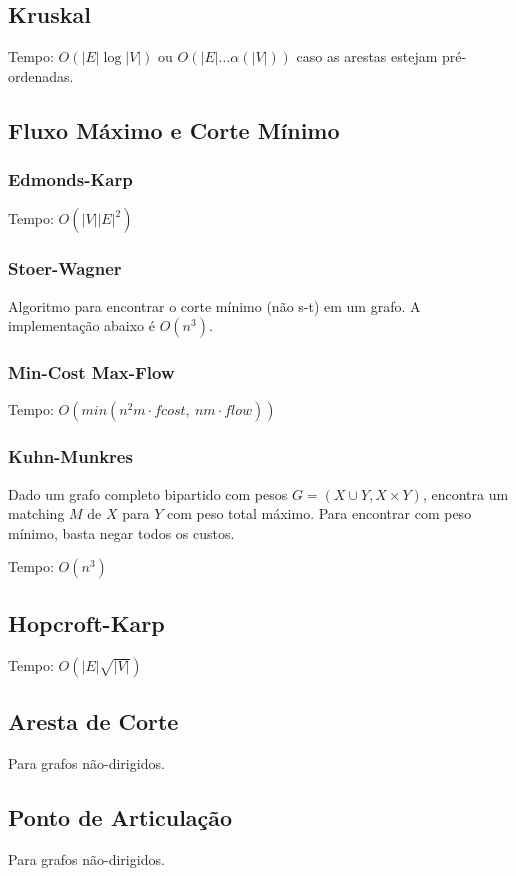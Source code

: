 \documentclass[12pt,a4paper]{article}
\begin{document}
		\subsection{Kruskal}
			Tempo: \( O(|E| \log |V|) \) ou \( O(|E| \ldots \alpha(|V|)) \) caso as arestas estejam pré-ordenadas.
			
		\subsection{Fluxo Máximo e Corte Mínimo}
			\subsubsection{Edmonds-Karp}
				Tempo: \( O(|V| |E|^2) \)
				
			\subsubsection{Stoer-Wagner}
				Algoritmo para encontrar o corte mínimo (não s-t) em um grafo. A implementação abaixo é \(O(n^3)\).
				
			\subsubsection{Min-Cost Max-Flow}
				Tempo: \( O(min(n^2 m \cdot fcost, ~ n m \cdot flow) ) \)
				
			\subsubsection{Kuhn-Munkres}
				Dado um grafo completo bipartido com pesos $ G = (X \cup Y, X \times Y) $, encontra um matching $M$ de $X$ para $Y$ com peso total máximo. Para encontrar com peso mínimo, basta negar todos os custos.

				Tempo: \( O(n^3) \)
				
		\subsection{Hopcroft-Karp}
			Tempo: \( O(|E| \sqrt{|V|})\)
			
		\subsection{Aresta de Corte}
			Para grafos não-dirigidos.
			
		\subsection{Ponto de Articulação}
			Para grafos não-dirigidos.
			
\end{document}
